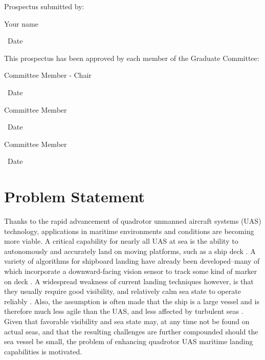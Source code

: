 \documentclass[12pt, letterpaper]{article}
\begin{document}
\hspace*{.47in}
\begin{minipage}[c]{5.25in}

\normalsize

Prospectus submitted by:

\vspace{.5in}

\makebox[2in]{\hrulefill} \hspace{1in} \makebox[2in]{\hrulefill}

\parbox[b]{3in}{Your name} \, Date
\vspace{0.5in}

This prospectus has been approved by each member of the Graduate Committee:
\vspace{0.5in}

\makebox[2in]{\hrulefill} \hspace{1in} \makebox[2in]{\hrulefill}

\parbox[b]{3in}{Committee Member - Chair} \, Date
\vspace{0.4in}

\makebox[2in]{\hrulefill} \hspace{1in} \makebox[2in]{\hrulefill}

\parbox[b]{3in}{Committee Member} \, Date
\vspace{0.4in}

\makebox[2in]{\hrulefill} \hspace{1in} \makebox[2in]{\hrulefill}

\parbox[b]{3in}{Committee Member} \, Date

\end{minipage}

\vspace*{\fill}

\pagebreak

\setcounter{page}{1}

\section{Problem Statement}

Thanks to the rapid advancement of quadrotor unmanned aircraft systems (UAS) technology, applications in maritime environments and conditions are becoming more viable.  A critical capability for nearly all UAS at sea is the ability to autonomously and accurately land on moving platforms, such as a ship deck \cite{Herisse2012}.  A variety of algorithms for shipboard landing have already been developed--many of which incorporate a downward-facing vision sensor to track some kind of marker on deck \cite{Truskin2013} \cite{Kong2014}.  A widespread weakness of current landing techniques however, is that they usually require good visibility, and relatively calm sea state to operate reliably \cite{Tan2016}. Also, the assumption is often made that the ship is a large vessel and is therefore much less agile than the UAS, and less affected by turbulent seas \cite{Ling2014}.  Given that favorable visibility and sea state may, at any time not be found on actual seas, and that the resulting challenges are further compounded should the sea vessel be small, the problem of enhancing quadrotor UAS maritime landing capabilities is motivated.  
\end{document}
